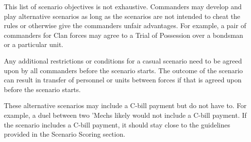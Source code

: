 This list of scenario objectives is not exhaustive.
Commanders may develop and play alternative scenarios as long as the scenarios are not intended to cheat the rules or otherwise give the commanders unfair advantages.
For example, a pair of commanders for Clan forces may agree to a Trial of Possession over a bondsman or a particular unit.

Any additional restrictions or conditions for a casual scenario need to be agreed upon by all commanders before the scenario starts.
The outcome of the scenario can result in transfer of personnel or units between forces if that is agreed upon before the scenario starts.

These alternative scenarios may include a C-bill payment but do not have to.
For example, a duel between two 'Mechs likely would not include a C-bill payment.
If the scenario includes a C-bill payment, it should stay close to the guidelines provided in the Scenario Scoring section.

